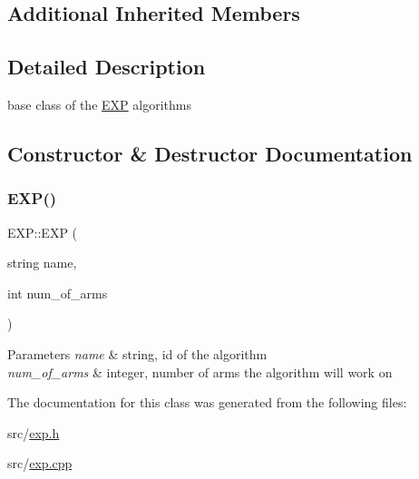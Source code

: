 \subsection*{Additional Inherited Members}


\subsection{Detailed Description}
base class of the \mbox{\hyperlink{class_e_x_p}{E\+XP}} algorithms 

\subsection{Constructor \& Destructor Documentation}
\mbox{\label{class_e_x_p_a1ec218c13f58399e79bdca89f761c511}} 
\subsubsection{\texorpdfstring{E\+X\+P()}{EXP()}}
{\footnotesize\ttfamily E\+X\+P\+::\+E\+XP (\begin{DoxyParamCaption}\item[{string}]{name,  }\item[{int}]{num\+\_\+of\+\_\+arms }\end{DoxyParamCaption})}


\begin{DoxyParams}{Parameters}
{\em name} & string, id of the algorithm \\
\hline
{\em num\+\_\+of\+\_\+arms} & integer, number of arms the algorithm will work on \\
\hline
\end{DoxyParams}


The documentation for this class was generated from the following files\+:\begin{DoxyCompactItemize}
\item 
src/\mbox{\hyperlink{exp_8h}{exp.\+h}}\item 
src/\mbox{\hyperlink{exp_8cpp}{exp.\+cpp}}\end{DoxyCompactItemize}
